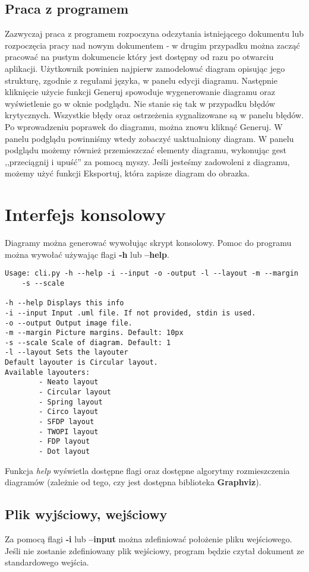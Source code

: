 \subsection{Praca z programem}

Zazwyczaj praca z programem rozpoczyna odczytania istniejącego dokumentu lub rozpoczęcia pracy nad nowym dokumentem - w drugim przypadku można zacząć pracować na pustym dokumencie który jest dostępny od razu po otwarciu aplikacji. Użytkownik powinien najpierw zamodelować diagram opisując jego strukturę, zgodnie z regułami języka, w panelu edycji diagramu. Następnie kliknięcie użycie funkcji Generuj spowoduje wygenerowanie diagramu oraz wyświetlenie go w oknie podglądu. Nie stanie się tak w przypadku błędów krytycznych. Wszystkie błędy oraz ostrzeżenia sygnalizowane są w panelu błędów. Po wprowadzeniu poprawek do diagramu, można znowu kliknąć Generuj. W panelu podglądu powinniśmy wtedy zobaczyć uaktualniony diagram. W panelu podglądu możemy również przemieszczać elementy diagramu, wykonując gest ,,przeciągnij i upuść'' za pomocą myszy. Jeśli jesteśmy zadowoleni z diagramu, możemy użyć funkcji Eksportuj, która zapisze diagram do obrazka.

\section{Interfejs konsolowy}

Diagramy można generować wywołując skrypt konsolowy. Pomoc do programu można wywołać używając flagi \textbf{-h} lub \textbf{--help}.

\begin{lstlisting}
Usage: cli.py -h --help -i --input -o -output -l --layout -m --margin 
	-s --scale
	
-h --help Displays this info
-i --input Input .uml file. If not provided, stdin is used.
-o --output Output image file.
-m --margin Picture margins. Default: 10px
-s --scale Scale of diagram. Default: 1
-l --layout Sets the layouter
Default layouter is Circular layout.
Available layouters:
        - Neato layout
        - Circular layout
        - Spring layout
        - Circo layout
        - SFDP layout
        - TWOPI layout
        - FDP layout
        - Dot layout
\end{lstlisting}

Funkcja \emph{help} wyświetla dostępne flagi oraz dostępne algorytmy rozmieszczenia diagramów (zależnie od tego, czy jest dostępna biblioteka \textbf{Graphviz}).

\subsection{Plik wyjściowy, wejściowy}
Za pomocą flagi \textbf{-i} lub \textbf{--input} można zdefiniować położenie pliku wejściowego. Jeśli nie zostanie zdefiniowany plik wejściowy, program będzie czytał dokument ze standardowego wejścia.

